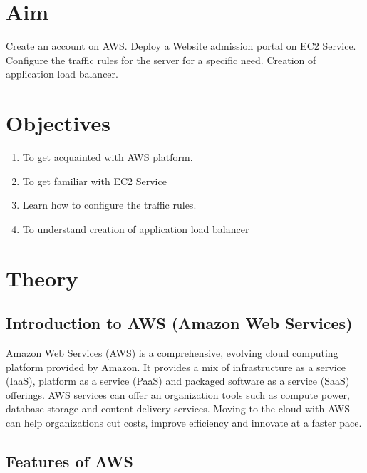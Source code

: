 \documentclass[11pt]{article}
\begin{document}
\tableofcontents
\thispagestyle{empty}
\clearpage

\setcounter{page}{1}

\section{Aim}
Create an account on AWS. Deploy a Website admission portal on EC2 Service.
Configure the traffic rules for the server for a specific need. Creation of application load
balancer.

\section{Objectives}
\begin{enumerate}
    \item To get acquainted with AWS platform.
    \item To get familiar with EC2 Service
    \item Learn how to configure the traffic rules.
    \item To understand creation of application load balancer
\end{enumerate}

\section{Theory}
\subsection{Introduction to AWS (Amazon Web Services)}
Amazon Web Services (AWS) is a comprehensive, evolving cloud computing platform provided by Amazon. It provides a mix of infrastructure as a service (IaaS), platform as a service (PaaS) and packaged software as a service (SaaS) offerings. AWS services can offer an organization tools such as compute power, database storage and content delivery services. Moving to the cloud with AWS can help organizations cut costs, improve efficiency and innovate at a faster pace.

\subsection{Features of AWS}
\end{document}
